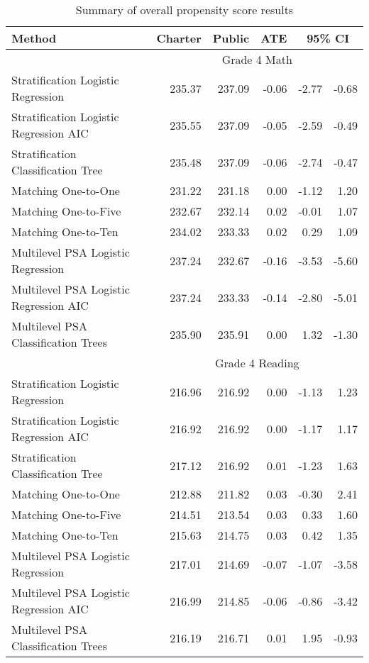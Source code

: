 \begin{table}[ht]
\centering
\caption{Summary of overall propensity score results} 
\begin{tabular}{lrrrrr}
  \hline Method & Charter & Public & ATE & \multicolumn{2}{c}{95\% CI} \\   \hline & \multicolumn{5}{c}{Grade 4 Math} \\ \cline{2-6} Stratification Logistic Regression & 235.37 & 237.09 & -0.06 & -2.77 & -0.68 \\ 
  Stratification Logistic Regression AIC & 235.55 & 237.09 & -0.05 & -2.59 & -0.49 \\ 
  Stratification Classification Tree & 235.48 & 237.09 & -0.06 & -2.74 & -0.47 \\ 
  Matching One-to-One & 231.22 & 231.18 & 0.00 & -1.12 & 1.20 \\ 
  Matching One-to-Five & 232.67 & 232.14 & 0.02 & -0.01 & 1.07 \\ 
  Matching One-to-Ten & 234.02 & 233.33 & 0.02 & 0.29 & 1.09 \\ 
  Multilevel PSA Logistic Regression & 237.24 & 232.67 & -0.16 & -3.53 & -5.60 \\ 
  Multilevel PSA Logistic Regression AIC & 237.24 & 233.33 & -0.14 & -2.80 & -5.01 \\ 
  Multilevel PSA Classification Trees & 235.90 & 235.91 & 0.00 & 1.32 & -1.30 \\ 
    \hline & \multicolumn{5}{c}{Grade 4 Reading} \\ \cline{2-6} Stratification Logistic Regression & 216.96 & 216.92 & 0.00 & -1.13 & 1.23 \\ 
  Stratification Logistic Regression AIC & 216.92 & 216.92 & 0.00 & -1.17 & 1.17 \\ 
  Stratification Classification Tree & 217.12 & 216.92 & 0.01 & -1.23 & 1.63 \\ 
  Matching One-to-One & 212.88 & 211.82 & 0.03 & -0.30 & 2.41 \\ 
  Matching One-to-Five & 214.51 & 213.54 & 0.03 & 0.33 & 1.60 \\ 
  Matching One-to-Ten & 215.63 & 214.75 & 0.03 & 0.42 & 1.35 \\ 
  Multilevel PSA Logistic Regression & 217.01 & 214.69 & -0.07 & -1.07 & -3.58 \\ 
  Multilevel PSA Logistic Regression AIC & 216.99 & 214.85 & -0.06 & -0.86 & -3.42 \\ 
  Multilevel PSA Classification Trees & 216.19 & 216.71 & 0.01 & 1.95 & -0.93 \\ 

\end{tabular}
\end{table}
